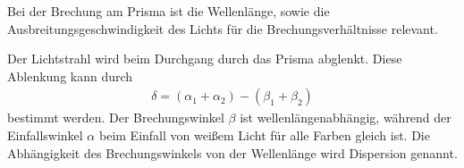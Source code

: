     Bei der Brechung am Prisma ist die Wellenlänge,
    sowie die Ausbreitungsgeschwindigkeit des Lichts für die Brechungsverhältnisse relevant.
    
    Der Lichtstrahl wird beim Durchgang durch das Prisma abglenkt.
    Diese Ablenkung kann durch
    \begin{eqnarray}
        \delta = (\alpha_1 + \alpha_2) - (\beta_1 + \beta_2)
    \end{eqnarray}
    bestimmt werden.
    Der Brechungswinkel $\beta$ ist wellenlängenabhängig,
    während der Einfallswinkel $\alpha$ beim Einfall von weißem Licht für alle Farben gleich ist.
    Die Abhängigkeit des Brechungswinkels von der Wellenlänge wird Dispersion genannt.

